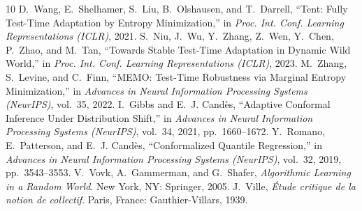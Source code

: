 \documentclass[10pt]{article}
\begin{document}
\begin{thebibliography}{10}
D.~Wang, E.~Shelhamer, S.~Liu, B.~Olshausen, and T.~Darrell, ``Tent: Fully Test-Time Adaptation by Entropy Minimization,'' in \emph{Proc. Int. Conf. Learning Representations (ICLR)}, 2021.
S.~Niu, J.~Wu, Y.~Zhang, Z.~Wen, Y.~Chen, P.~Zhao, and M.~Tan, ``Towards Stable Test-Time Adaptation in Dynamic Wild World,'' in \emph{Proc. Int. Conf. Learning Representations (ICLR)}, 2023.
M.~Zhang, S.~Levine, and C.~Finn, ``MEMO: Test-Time Robustness via Marginal Entropy Minimization,'' in \emph{Advances in Neural Information Processing Systems (NeurIPS)}, vol.~35, 2022.
I.~Gibbs and E.~J. Cand\`es, ``Adaptive Conformal Inference Under Distribution Shift,'' in \emph{Advances in Neural Information Processing Systems (NeurIPS)}, vol.~34, 2021, pp.~1660--1672.
Y.~Romano, E.~Patterson, and E.~J. Cand\`es, ``Conformalized Quantile Regression,'' in \emph{Advances in Neural Information Processing Systems (NeurIPS)}, vol.~32, 2019, pp.~3543--3553.
V.~Vovk, A.~Gammerman, and G.~Shafer, \emph{Algorithmic Learning in a Random World}. New York, NY: Springer, 2005.
J.~Ville, \emph{\'Etude critique de la notion de collectif}. Paris, France: Gauthier-Villars, 1939.
\end{thebibliography}
\end{document}
